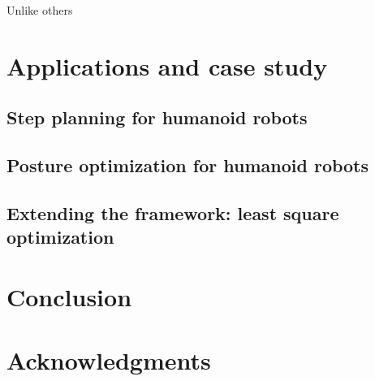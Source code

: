 \documentclass[conference,final,a4paper,twocolumn,9pt]{IEEEtran}
\begin{document}
Unlike others


\section{Applications and case study}\label{sec:application}

\subsection{Step planning for humanoid robots}
\subsection{Posture optimization for humanoid robots}
\subsection{Extending the framework: least square optimization}

\section{Conclusion}\label{sec:conclusion}

\section*{Acknowledgments}\label{sec:acknowledgments}
\end{document}
